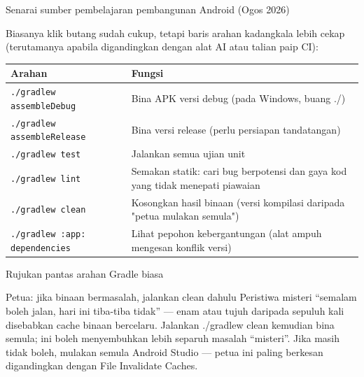 \begin{center}\small\color{gray}Senarai sumber pembelajaran pembangunan Android (Ogos 2026)\end{center}


Biasanya klik butang sudah cukup, tetapi baris arahan kadangkala lebih cekap (terutamanya apabila digandingkan dengan alat AI atau talian paip CI):

\begin{center}
\begin{tabularx}{\linewidth}{|X|X|}
\hline
\textbf{Arahan} & \textbf{Fungsi} \tabularnewline
\hline
\texttt{.\allowbreak /\allowbreak gradlew assembleDebug} & Bina APK versi debug (pada Windows, buang ./) \tabularnewline
\texttt{.\allowbreak /\allowbreak gradlew assembleRelease} & Bina versi release (perlu persiapan tandatangan) \tabularnewline
\texttt{.\allowbreak /\allowbreak gradlew test} & Jalankan semua ujian unit \tabularnewline
\texttt{.\allowbreak /\allowbreak gradlew lint} & Semakan statik: cari bug berpotensi dan gaya kod yang tidak menepati piawaian \tabularnewline
\texttt{.\allowbreak /\allowbreak gradlew clean} & Kosongkan hasil binaan (versi kompilasi daripada "petua mulakan semula") \tabularnewline
\texttt{.\allowbreak /\allowbreak gradlew :app: dependencies} & Lihat pepohon kebergantungan (alat ampuh mengesan konflik versi) \tabularnewline
\hline
\end{tabularx}
\end{center}

\begin{center}\small\color{gray}Rujukan pantas arahan Gradle biasa\end{center}

\begin{tcbinfo}{Petua: jika binaan bermasalah, jalankan clean dahulu}
Peristiwa misteri “semalam boleh jalan, hari ini tiba-tiba tidak” — enam atau tujuh daripada sepuluh kali disebabkan cache binaan bercelaru. Jalankan ./gradlew clean kemudian bina semula; ini boleh menyembuhkan lebih separuh masalah “misteri”. Jika masih tidak boleh, mulakan semula Android Studio — petua ini paling berkesan digandingkan dengan File Invalidate Caches.

\end{tcbinfo}



